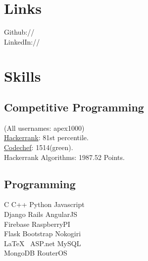 \documentclass[]{deedy-resume-openfont}
\begin{document}
\begin{minipage}[t]{0.33\textwidth}
\sectionsep



\section{Links} 
Github:// \href{https://github.com/apex1000}{} \\
LinkedIn://  \href{https://www.linkedin.com/in/apex1000}{}
\sectionsep



\section{Skills}
\subsection{Competitive Programming}
(All usernames: apex1000)\\
\href{https://www.hackerrank.com/apex1000}{Hackerrank}: 81st percentile. \\
\href{https://www.codechef.com/users/apex1000}{Codechef}: 1514(green).\\
Hackerrank Algorithms: 1987.52 Points.
\sectionsep


\subsection{Programming}
C \textbullet{}  C++ \textbullet{} Python \textbullet{} Javascript \\
 \textbullet{} Django \textbullet{} Rails \textbullet{} AngularJS \\
 \textbullet{} Firebase \textbullet{} RaspberryPI\\
Flask \textbullet{} Bootstrap \textbullet{} Nokogiri \\
\textbullet{} \LaTeX\ \textbullet{} ASP.net \textbullet{} MySQL\\
\textbullet{} MongoDB \textbullet{} RouterOS \\

%
%

\end{minipage} 
\end{document}
